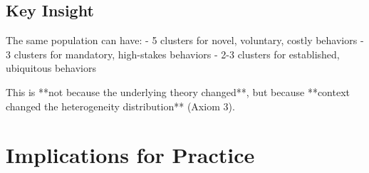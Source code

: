 \subsection{Key Insight}

The same population can have:
- 5 clusters for novel, voluntary, costly behaviors
- 3 clusters for mandatory, high-stakes behaviors
- 2-3 clusters for established, ubiquitous behaviors

This is **not because the underlying theory changed**, but because **context
changed the heterogeneity distribution** (Axiom 3).

\section{Implications for Practice}
\label{sec:ba-practice}

